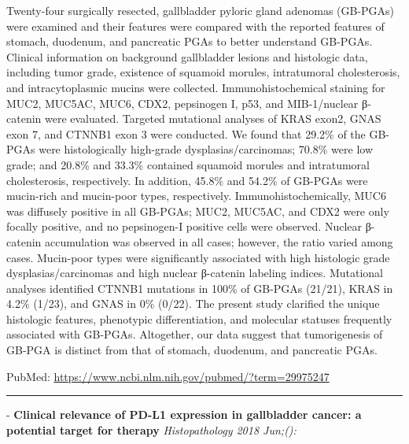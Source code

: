 \documentclass[]{article}
\begin{document}
Twenty-four surgically resected, gallbladder pyloric gland adenomas
(GB-PGAs) were examined and their features were compared with the
reported features of stomach, duodenum, and pancreatic PGAs to better
understand GB-PGAs. Clinical information on background gallbladder
lesions and histologic data, including tumor grade, existence of
squamoid morules, intratumoral cholesterosis, and intracytoplasmic
mucins were collected. Immunohistochemical staining for MUC2, MUC5AC,
MUC6, CDX2, pepsinogen I, p53, and MIB-1/nuclear β-catenin were
evaluated. Targeted mutational analyses of KRAS exon2, GNAS exon 7, and
CTNNB1 exon 3 were conducted. We found that 29.2\% of the GB-PGAs were
histologically high-grade dysplasias/carcinomas; 70.8\% were low grade;
and 20.8\% and 33.3\% contained squamoid morules and intratumoral
cholesterosis, respectively. In addition, 45.8\% and 54.2\% of GB-PGAs
were mucin-rich and mucin-poor types, respectively.
Immunohistochemically, MUC6 was diffusely positive in all GB-PGAs; MUC2,
MUC5AC, and CDX2 were only focally positive, and no pepsinogen-I
positive cells were observed. Nuclear β-catenin accumulation was
observed in all cases; however, the ratio varied among cases. Mucin-poor
types were significantly associated with high histologic grade
dysplasias/carcinomas and high nuclear β-catenin labeling indices.
Mutational analyses identified CTNNB1 mutations in 100\% of GB-PGAs
(21/21), KRAS in 4.2\% (1/23), and GNAS in 0\% (0/22). The present study
clarified the unique histologic features, phenotypic differentiation,
and molecular statuses frequently associated with GB-PGAs. Altogether,
our data suggest that tumorigenesis of GB-PGA is distinct from that of
stomach, duodenum, and pancreatic PGAs.

PubMed: \url{https://www.ncbi.nlm.nih.gov/pubmed/?term=29975247}

{}

{}

\begin{center}\rule{0.5\linewidth}{\linethickness}\end{center}

 - \textbf{Clinical relevance of PD-L1 expression in gallbladder cancer:
a potential target for therapy} \emph{Histopathology 2018 Jun;():}
\end{document}
